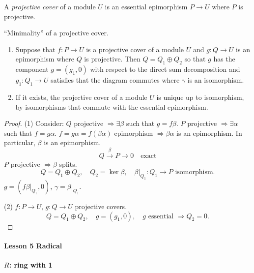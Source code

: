 \documentclass[11pt, a4paper]{report}
\begin{document}
\begin{definition}
A \emph{projective cover} of a module $U$ is an essential epimorphism $P \rightarrow U$ where $P$ is projective.
\end{definition}

\begin{proposition}
``Minimality'' of a projective cover.
\begin{enumerate}
\item Suppose that $f: P \rightarrow U$ is a projective cover of a module $U$ and $g: Q \rightarrow U$ is an epimorphism where $Q$ is projective. Then $Q = Q_{1} \oplus Q_{2}$ so that $g$ has the component $g = (g_{1}, 0)$ with respect to the direct sum decomposition and $g_{1}: Q_{1} \rightarrow U$ satisfies that the diagram commutes where $\gamma$ is an isomorphism.
\item If it exists, the projective cover of a module $U$ is unique up to isomorphism, by isomorphisms that commute with the essential epimorphism.
\end{enumerate}
\end{proposition}

\begin{proof}
(1) Consider:
$Q$ projective $\Rightarrow \exists \beta$ such that $g = f\beta$.
$P$ projective $\Rightarrow \exists \alpha$ such that $f = g\alpha$.
$f = g\alpha = f(\beta\alpha)$ epimorphism $\Rightarrow \beta\alpha$ is an epimorphism.
In particular, $\beta$ is an epimorphism.
\[
Q \xrightarrow{\beta} P \rightarrow 0 \quad \text{exact}
\]
$P$ projective $\Rightarrow \beta$ splits.
\[
Q = Q_{1} \oplus Q_{2}, \quad Q_{2} = \ker \beta, \quad \beta|_{Q_{1}}: Q_{1} \rightarrow P \text{ isomorphism.}
\]
$g = (f\beta|_{Q_{1}}, 0)$, $\gamma = \beta|_{Q_{1}}$.

(2) $f: P \rightarrow U$, $g: Q \rightarrow U$ projective covers.
\[
Q = Q_{1} \oplus Q_{2}, \quad g = (g_{1}, 0), \quad g \text{ essential } \Rightarrow Q_{2} = 0.
\]
\end{proof}

\paragraph{Lesson 5 Radical}

\paragraph{$R$: ring with 1}
\end{document}

